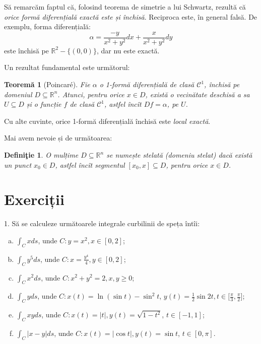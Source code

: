 \documentclass[11pt,a4paper]{article}
\newcommand\kal{\mathcal}
\newcommand\seq{\subseteq}
\newcommand\RR{\mathbb{R}}
\theoremstyle{dotless}
\newtheorem{theorem}{Teorem\u{a}}[section]
\theoremstyle{dotlessdr}
\newtheorem{definition}{Defini\c{t}ie}[section]
\begin{document}
Să remarcăm faptul că, folosind teorema de simetrie a lui Schwartz, rezultă
că \emph{orice formă diferențială exactă este și închisă}. Reciproca este,
în general falsă. De exemplu, forma diferențială:
\[
  \alpha = \frac{-y}{x^2 + y^2} dx + \frac{x}{x^2 + y^2} dy
\]
este închisă pe $\RR^2 - \{(0, 0)\}$, dar nu este exactă.

Un rezultat fundamental este următorul:

\begin{theorem}[Poincar\'{e}]\label{thm:poinc}
  Fie $\alpha$ o 1-formă diferențială de clasă $\kal{C}^1$, închisă pe domeniul
  $D \seq \RR^n$. Atunci, pentru orice $x \in D$, există o vecinătate deschisă a
  sa $U \seq D$ și o funcție $f$ de clasă $\kal{C}^1$, astfel încît $Df = \alpha$,
  \emph{pe $U$}.
\end{theorem}

Cu alte cuvinte, orice 1-formă diferențială închisă este \emph{local exactă}.

Mai avem nevoie și de următoarea:

\begin{definition}\label{def:stelat}
  O mulțime $D \seq \RR^n$ se numește \emph{stelată} (\emph{domeniu stelat}) dacă
  există un punct $x_0 \in D$, astfel încît segmentul $[x_0, x] \seq D$, pentru orice
  $x \in D$.
\end{definition}


\section{Exerciții}
\label{sec:exc}

1. Să se calculeze următoarele integrale curbilinii de speța întîi:
\begin{enumerate}[(a)]
\item $\int_C x ds$, unde $C: y = x^2, x \in [0, 2]$;
\item $\int_C y^5 ds$, unde $C: x = \frac{y^4}{4}, y \in [0, 2]$;
\item $\int_C x^2 ds$, unde $C: x^2 + y^2 = 2, x, y \geq 0$;
\item $\int_C yds$, unde $C: x(t) = \ln(\sin t) - \sin^2 t$,
  $y(t) = \frac{1}{2} \sin 2t, t \in \big[ \frac{\pi}{3}, \frac{\pi}{2} \big]$;
\item $\int_C xyds$, unde $C: x(t) = |t|, y(t) = \sqrt{1 - t^2}$, $t \in [-1, 1]$;
\item $\int_C |x - y| ds$, unde $C: x(t) = |\cos t|, y(t) = \sin t$, $t \in [0, \pi]$.
\end{enumerate}
\end{document}
